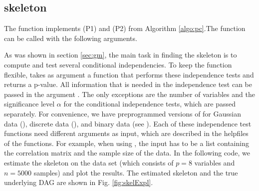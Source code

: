 \documentclass[article]{jss}
\begin{document}
\subsection{skeleton}\label{sec:skel}
The function  implements (P1) and (P2) from Algorithm
\ref{algo:pc}.The function can be called with the following arguments.


As was shown in section \ref{sec:gm}, the main task in finding the
skeleton is to compute and test several conditional independencies. To
keep the function flexible,  takes as argument a
function  that performs these independence tests and
returns a p-value. All information that is needed in the independence
test can be passed in the argument . The only
exceptions are the number of variables  and the significance
level $\alpha$ for the conditional independence tests, which are
passed separately. For convenience, we have preprogrammed versions of
 for Gaussian data (), discrete data
(), and binary data (see ). Each of
these independence test functions need different arguments as input,
which are described in the helpfiles of the functions. For example,
when using , the input has to be a list containing
the correlation matrix and the sample size of the data.  In the
following code, we estimate the skeleton on the data set
 (which consists of $p=8$ variables and $n=5000$
samples) and plot the results. The estimated skeleton and the true
underlying DAG are shown in Fig. \ref{fig:skelExpl}.
\end{document}
